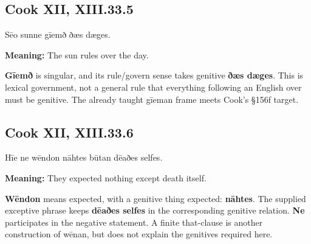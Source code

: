 \par\begin{minipage}{\linewidth}\raggedright
\subsection*{Cook XII, XIII.33.5}

Sēo sunne gīemð ðæs dæges.

\textbf{Meaning:} The sun rules over the day.

\textbf{Gīemð} is singular, and its rule/\allowbreak{}govern sense takes genitive \textbf{ðæs dæges}. This is lexical government, not a general rule that everything following an English over must be genitive. The already taught gīeman frame meets Cook’s §156f target.

\end{minipage}\par\addvspace{4pt}

\par\begin{minipage}{\linewidth}\raggedright
\subsection*{Cook XII, XIII.33.6}

Hīe ne wēndon nāhtes būtan dēaðes selfes.

\textbf{Meaning:} They expected nothing except death itself.

\textbf{Wēndon} means expected, with a genitive thing expected: \textbf{nāhtes}. The supplied exceptive phrase keeps \textbf{dēaðes selfes} in the corresponding genitive relation. \textbf{Ne} participates in the negative statement. A finite that-clause is another construction of wēnan, but does not explain the genitives required here.

\end{minipage}\par\addvspace{4pt}

